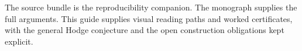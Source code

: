 \documentclass[11pt]{article}
\begin{document}
\vfill
\colorbox{Soft}{\parbox{\dimexpr\linewidth-2\fboxsep\relax}{\small The source bundle is the reproducibility companion. The monograph supplies the full arguments. This guide supplies visual reading paths and worked certificates, with the general Hodge conjecture and the open construction obligations kept explicit.}}
\end{document}
